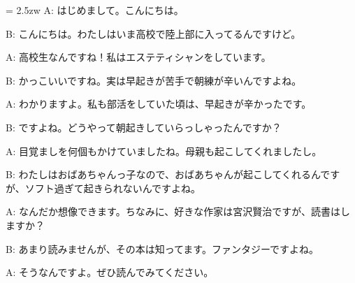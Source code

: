\documentclass[11pt]{amsart}
\title{}
\author{}
\newenvironment{hangall}[1]{\hangindent = 2.5zw\everypar{\hangindent = 2.5zw}}{}
\begin{document}
\maketitle
\begin{hangall}{}%
A: はじめまして。こんにちは。

B: こんにちは。わたしはいま高校で陸上部に入ってるんですけど。

A: 高校生なんですね！私はエステティシャンをしています。

B: かっこいいですね。実は早起きが苦手で朝練が辛いんですよね。

A: わかりますよ。私も部活をしていた頃は、早起きが辛かったです。

B: ですよね。どうやって朝起きしていらっしゃったんですか？

A: 目覚ましを何個もかけていましたね。母親も起こしてくれましたし。

B: わたしはおばあちゃんっ子なので、おばあちゃんが起こしてくれるんですが、ソフト過ぎて起きられないんですよね。

A: なんだか想像できます。ちなみに、好きな作家は宮沢賢治ですが、読書はしますか？

B: あまり読みませんが、その本は知ってます。ファンタジーですよね。

A: そうなんですよ。ぜひ読んでみてください。
\end{hangall}
\end{document}
